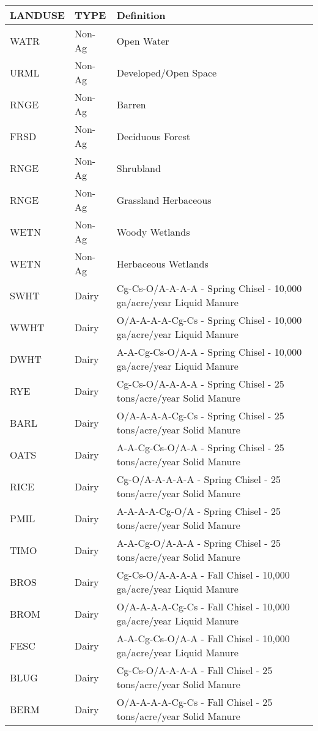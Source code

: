 \begin{longtable}{lll}
  \hline
LANDUSE & TYPE & Definition \\ 
  \hline
WATR & Non-Ag & Open Water \\ 
  URML & Non-Ag & Developed/Open Space \\ 
  RNGE & Non-Ag & Barren \\ 
  FRSD & Non-Ag & Deciduous Forest \\ 
  RNGE & Non-Ag & Shrubland \\ 
  RNGE & Non-Ag & Grassland Herbaceous \\ 
  WETN & Non-Ag & Woody Wetlands \\ 
  WETN & Non-Ag & Herbaceous Wetlands \\ 
  SWHT & Dairy & Cg-Cs-O/A-A-A-A - Spring Chisel - 10,000 ga/acre/year Liquid Manure \\ 
  WWHT & Dairy & O/A-A-A-A-Cg-Cs - Spring Chisel - 10,000 ga/acre/year Liquid Manure \\ 
  DWHT & Dairy & A-A-Cg-Cs-O/A-A - Spring Chisel - 10,000 ga/acre/year Liquid Manure \\ 
  RYE & Dairy & Cg-Cs-O/A-A-A-A - Spring Chisel - 25 tons/acre/year Solid Manure \\ 
  BARL & Dairy & O/A-A-A-A-Cg-Cs - Spring Chisel - 25 tons/acre/year Solid Manure \\ 
  OATS & Dairy & A-A-Cg-Cs-O/A-A - Spring Chisel - 25 tons/acre/year Solid Manure \\ 
  RICE & Dairy & Cg-O/A-A-A-A-A - Spring Chisel - 25 tons/acre/year Solid Manure \\ 
  PMIL & Dairy & A-A-A-A-Cg-O/A - Spring Chisel - 25 tons/acre/year Solid Manure \\ 
  TIMO & Dairy & A-A-Cg-O/A-A-A - Spring Chisel - 25 tons/acre/year Solid Manure \\ 
  BROS & Dairy & Cg-Cs-O/A-A-A-A - Fall Chisel - 10,000 ga/acre/year Liquid Manure \\ 
  BROM & Dairy & O/A-A-A-A-Cg-Cs - Fall Chisel - 10,000 ga/acre/year Liquid Manure \\ 
  FESC & Dairy & A-A-Cg-Cs-O/A-A - Fall Chisel - 10,000 ga/acre/year Liquid Manure \\ 
  BLUG & Dairy & Cg-Cs-O/A-A-A-A - Fall Chisel - 25 tons/acre/year Solid Manure \\ 
  BERM & Dairy & O/A-A-A-A-Cg-Cs - Fall Chisel - 25 tons/acre/year Solid Manure \\ 

\end{longtable}
